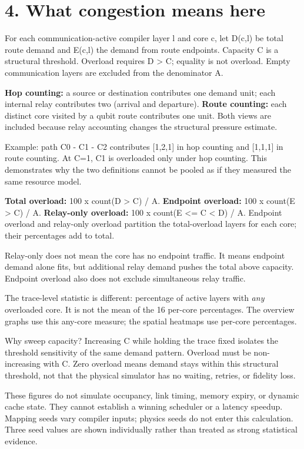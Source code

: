 \documentclass[10pt,a4paper]{article}
\begin{document}
\section*{4. What congestion means here}
For each communication-active compiler layer l and core c, let D(c,l) be total route demand and E(c,l) the demand from route endpoints. Capacity C is a structural threshold. Overload requires D > C; equality is not overload. Empty communication layers are excluded from the denominator A.\par
\textbf{Hop counting:} a source or destination contributes one demand unit; each internal relay contributes two (arrival and departure). \textbf{Route counting:} each distinct core visited by a qubit route contributes one unit. Both views are included because relay accounting changes the structural pressure estimate.\par
Example: path C0 - C1 - C2 contributes [1,2,1] in hop counting and [1,1,1] in route counting. At C=1, C1 is overloaded only under hop counting. This demonstrates why the two definitions cannot be pooled as if they measured the same resource model.\par
\textbf{Total overload:} 100 x count(D > C) / A. \textbf{Endpoint overload:} 100 x count(E > C) / A. \textbf{Relay-only overload:} 100 x count(E <= C < D) / A. Endpoint overload and relay-only overload partition the total-overload layers for each core; their percentages add to total.\par
Relay-only does not mean the core has no endpoint traffic. It means endpoint demand alone fits, but additional relay demand pushes the total above capacity. Endpoint overload also does not exclude simultaneous relay traffic.\par
The trace-level statistic is different: percentage of active layers with \emph{any} overloaded core. It is not the mean of the 16 per-core percentages. The overview graphs use this any-core measure; the spatial heatmaps use per-core percentages.\par
Why sweep capacity? Increasing C while holding the trace fixed isolates the threshold sensitivity of the same demand pattern. Overload must be non-increasing with C. Zero overload means demand stays within this structural threshold, not that the physical simulator has no waiting, retries, or fidelity loss.\par
These figures do not simulate occupancy, link timing, memory expiry, or dynamic cache state. They cannot establish a winning scheduler or a latency speedup. Mapping seeds vary compiler inputs; physics seeds do not enter this calculation. Three seed values are shown individually rather than treated as strong statistical evidence.\par
\end{document}
